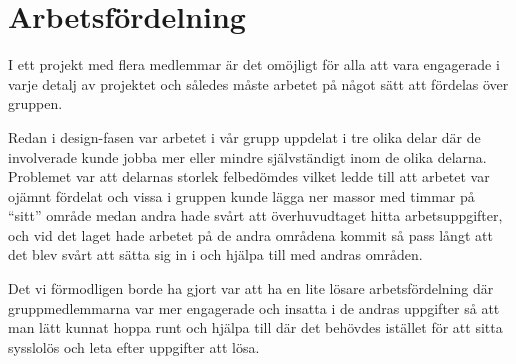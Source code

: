 \section{Arbetsfördelning}
I ett projekt med flera medlemmar är det omöjligt för alla att vara
engagerade i varje detalj av projektet och således måste arbetet på
något sätt att fördelas över gruppen.

Redan i design-fasen var arbetet i vår grupp uppdelat i tre olika
delar där de involverade kunde jobba mer eller mindre självständigt
inom de olika delarna. Problemet var att delarnas storlek felbedömdes
vilket ledde till att arbetet var ojämnt fördelat och vissa i gruppen
kunde lägga ner massor med timmar på ``sitt'' område medan andra hade
svårt att överhuvudtaget hitta arbetsuppgifter, och vid det laget
hade arbetet på de andra områdena kommit så pass långt att det blev
svårt att sätta sig in i och hjälpa till med andras områden.

Det vi förmodligen borde ha gjort var att ha en lite lösare
arbetsfördelning där gruppmedlemmarna var mer engagerade och insatta i
de andras uppgifter så att man lätt kunnat hoppa runt och hjälpa till där
det behövdes istället för att sitta sysslolös och leta efter uppgifter
att lösa.
